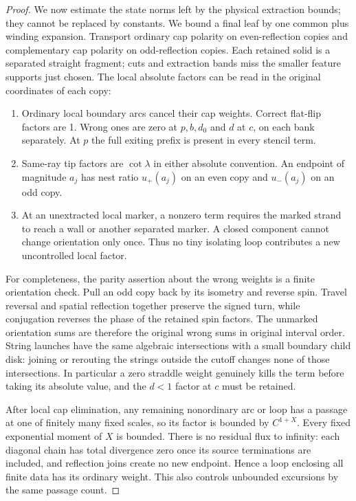 \begin{proof}
We now estimate the state norms left by the physical extraction
bounds; they cannot be replaced by constants.  We bound a final leaf
by one common plus winding expansion.
Transport ordinary cap polarity on even-reflection copies and
complementary cap polarity on odd-reflection copies.  Each retained
solid is a separated straight fragment; cuts and extraction bands
miss the smaller feature supports just chosen.  The local absolute
factors can be read in the original coordinates of each copy:
\begin{enumerate}[label=(\roman*),leftmargin=*]
\item Ordinary local boundary arcs cancel their cap weights.
Correct flat-flip factors are 1.  Wrong ones are zero at
$p,b,d_0$ and $d$ at $c$, on each bank separately.  At $p$ the
full exiting prefix is present in every stencil term.
\item Same-ray tip factors are $\cot\lambda$ in either absolute
convention.  An endpoint of magnitude $a_j$ has nest ratio
$u_+(a_j)$ on an even copy and $u_-(a_j)$ on an odd copy.
\item At an unextracted local marker, a nonzero term requires the
marked strand to reach a wall or another separated marker.  A
closed component cannot change orientation only once.  Thus no
tiny isolating loop contributes a new uncontrolled local factor.
\end{enumerate}
For completeness, the parity assertion about the wrong weights is
a finite orientation check.  Pull an odd copy back by its isometry
and reverse spin.  Travel reversal and spatial reflection together
preserve the signed turn, while conjugation reverses the phase of
the retained spin factors.  The unmarked orientation sums are
therefore the original wrong sums in original interval order.
String launches have the same algebraic intersections with a small
boundary child disk: joining or rerouting the strings outside the
cutoff changes none of those intersections.  In particular a zero
straddle weight genuinely kills the term before taking its absolute
value, and the $d<1$ factor at $c$ must be retained.

After local cap elimination, any remaining nonordinary arc or loop
has a passage at one of finitely many fixed scales, so its factor
is bounded by $C^{1+X}$.  Every fixed exponential moment of $X$ is
bounded.  There is no residual flux to infinity: each diagonal
chain has total divergence zero once its source terminations are
included, and reflection joins create no new endpoint.  Hence a
loop enclosing all finite data has its ordinary weight.  This
also controls unbounded excursions by the same passage count.


\end{proof}
